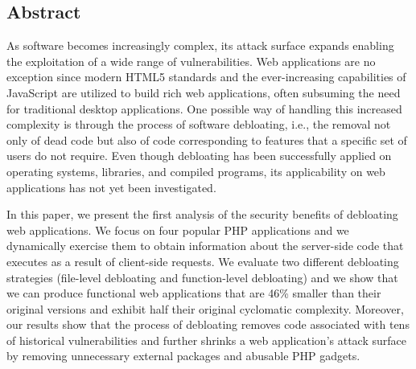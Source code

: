 \subsection*{Abstract}

As software becomes increasingly complex, its attack surface expands enabling
the exploitation of a wide range of vulnerabilities. Web applications are no
exception since modern HTML5 standards and the ever-increasing capabilities
of JavaScript are utilized to build rich web applications, often subsuming
the need for traditional desktop applications. One possible way of handling
this increased complexity is through the process of software debloating, i.e.,
the removal not only of dead code but also of code corresponding to features
that a specific set of users do not require. Even though debloating has been
successfully applied on operating systems, libraries, and compiled programs,
its applicability on web applications has not yet been investigated.

In this paper, we present the first analysis of the security benefits of
debloating web applications. We focus on four popular PHP applications and
we dynamically exercise them to obtain information about the server-side code
that executes as a result of client-side requests. We evaluate two different
debloating strategies (file-level debloating and function-level debloating)
and we show that we can produce functional web applications that are 46\%
smaller than their original versions and exhibit half their original cyclomatic
complexity. Moreover, our results show that the process of debloating removes
code associated with tens of historical vulnerabilities and further shrinks
a web application's attack surface by removing unnecessary external packages
and abusable PHP gadgets.


